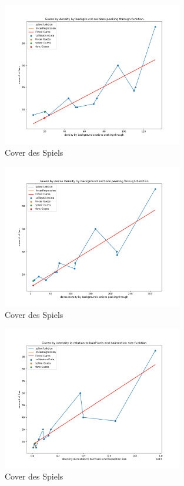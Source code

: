 \documentclass[german,a4paper,12pt,smallheadings,headsepline, titlepage, liststotoc, idextotoc,bibtoctoc,blibliography = totocnumbered]{scrartcl}
\begin{document}
\begin{figure}
	\centering
	\includegraphics[width=0.7\textwidth]{fig64/g06_densitybybackgorundsections.png}
	\caption[]{Cover des Spiels}
	\label{img:cover}
\end{figure}
\begin{figure}
	\centering
	\includegraphics[width=0.7\textwidth]{fig64/g07_denseDensitybyBackgroundSections.png}
	\caption[]{Cover des Spiels}
	\label{img:cover}
\end{figure}
\begin{figure}
	\centering
	\includegraphics[width=0.7\textwidth]{fig64/g08_intensitynorm.png}
	\caption[]{Cover des Spiels}
	\label{img:cover}
\end{figure}
\end{document}
